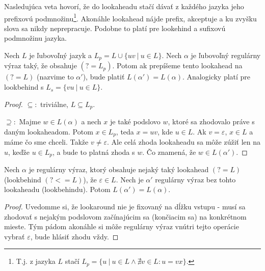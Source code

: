\documentclass{svk_long_sk}
\begin{document}
Nasledujúca veta hovorí, že do lookaheadu stačí dávať z každého jazyka jeho prefixovú podmnožinu\footnote{T.j. z jazyka $L$ stačí $L_p=\lbrace u~|~ u\in L \wedge \nexists v \in L: u = vx \rbrace$.}. Akonáhle lookahead nájde prefix, akceptuje a ku zvyšku slova sa nikdy neprepracuje. Podobne to platí pre lookehind a sufixovú podmnožinu jazyka. 
\begin{theorem}\label{bezprefixove}
Nech $L$ je ľubovoľný jazyk a $L_p = L \cup \lbrace uv ~|~ u \in L \rbrace$. Nech $\alpha$ je ľubovoľný regulárny výraz taký, že obsahuje $(?=L_p)$. Potom ak prepíšeme tento lookahead na $(?=L)$ (nazvime to $\alpha '$), bude platiť $L(\alpha ') = L(\alpha )$. Analogicky platí pre lookbehind s $L_s=\lbrace vu ~|~ u\in L\rbrace$.
\end{theorem}
\begin{proof}
$\subseteq :$ triviálne,  $L \subseteq L_p$.

$\supseteq :$ Majme $w \in L(\alpha)$ a nech $x$ je také podslovo $w$, ktoré sa zhodovalo práve s daným lookaheadom. Potom $x \in L_p$, teda $x=uv$, kde $u \in L$. Ak $v=\varepsilon$, $x \in L$ a máme čo sme chceli. Takže $v\neq \varepsilon$. Ale celá zhoda lookaheadu sa môže zúžiť len na $u$, keďže $u \in L_p$, a bude to platná zhoda s $w$. Čo znamená, že $w \in L(\alpha ')$.
\end{proof}

\begin{corollary}
Nech $\alpha$ je regulárny výraz, ktorý obsahuje nejaký taký lookahead $(?=L)$ (lookbehind $(?<=L)$), že $\varepsilon \in L$. Nech je $\alpha '$ regulárny výraz bez tohto lookaheadu (lookbehindu). Potom $L(\alpha ') = L(\alpha)$.
\end{corollary}
\begin{proof}
Uvedomme si, že lookaround nie je fixovaný na dĺžku vstupu - musí sa zhodovať s nejakým podslovom začínajúcim sa (končiacim sa) na konkrétnom mieste. Tým pádom akonáhle si môže regulárny výraz vnútri tejto operácie vybrať $\varepsilon$, bude hlásiť zhodu vždy.
\end{proof}
\end{document}
